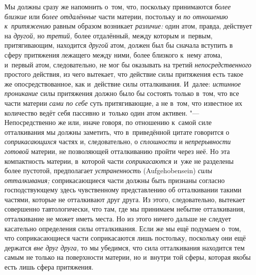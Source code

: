 Мы должны сразу же напомнить о~том, что, поскольку принимаются
{\em более близкие} или {\em более
отдалённые} части материи, постольку и {\em по
отношению к~притяжению} равным образом возникает
{\em различие:} один атом, правда, действует на {\em другой,} но {\em третий,}
более отдалённый, между которым и~первым, притягивающим, находится
{\em другой} атом, должен был бы сначала вступить в
сферу притяжения лежащего между ними, более близкого к~нему атома, и~первый
атом, следовательно, не мог бы оказывать на третий
{\em непосредственного} простого действия, из чего
вытекает, что действие силы притяжения есть такое же опосредствованное, как
и~действие силы отталкивания. И~далее: {\em истинное
проникание} силы притяжения должно было бы состоять только в~том, что все
части материи {\em сами по себе} суть притягивающие, а
не в~том, что известное их количество ведёт себя пассивно и~только один
атом активен. "--- Непосредственно же или, иначе говоря, по отношению к~самой
силе отталкивания мы должны заметить, что в~приведённой цитате говорится о
{\em соприкасающихся} частях и, следовательно, о
{\em сплошности} и
{\em непрерывности готовой} материи, не позволяющей
отталкиванию пройти через неё. Но эта компактность материи, в~которой части
{\em соприкасаются} и~уже не разделены более пустотой,
предполагает {\em устраненность} (Auf\-ge\-ho\-ben\-sein)
{\em силы отталкивания;} соприкасающиеся части должны
быть признаны согласно господствующему здесь чувственному представлению об
отталкивании такими частями, которые не отталкивают друг друга. Из этого,
следовательно, вытекает совершенно тавтологически, что там, где мы
принимаем небытие отталкивания, отталкивание не может иметь места. Но из
этого ничего дальше не следует касательно определения силы отталкивания.
Если же мы ещё подумаем о~том, что соприкасающиеся части соприкасаются лишь
постольку, поскольку они ещё держатся {\em вне друг
друга,} то мы убедимся, что сила отталкивания находится тем самым не только
на поверхности материи, но и~внутри той сферы, которая якобы есть лишь
сфера притяжения.

